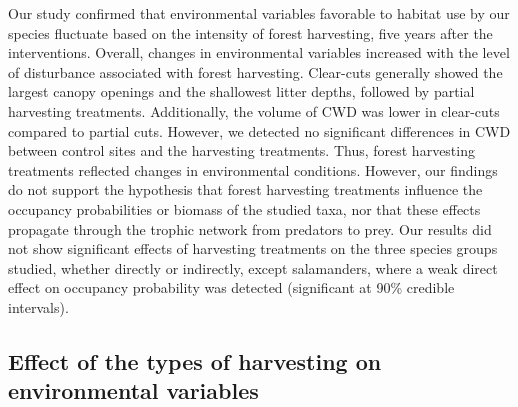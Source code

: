 Our study confirmed that environmental variables favorable to habitat use by our species fluctuate based on the intensity of forest harvesting, five years after the interventions. 
Overall, changes in environmental variables increased with the level of disturbance associated with forest harvesting. 
Clear-cuts generally showed the largest canopy openings and the shallowest litter depths, followed by partial harvesting treatments. 
Additionally, the volume of CWD was lower in clear-cuts compared to partial cuts. However, we detected no significant differences in CWD between control sites and the harvesting treatments. 
Thus, forest harvesting treatments reflected changes in environmental conditions. 
However, our findings do not support the hypothesis that forest harvesting treatments influence the occupancy probabilities or biomass of the studied taxa, nor that these effects propagate through the trophic network from predators to prey. 
Our results did not show significant effects of harvesting treatments on the three species groups studied, whether directly or indirectly, 
except salamanders, where a weak direct effect on occupancy probability was detected (significant at 90\% credible intervals). 

\subsection*{Effect of the types of harvesting on environmental variables}
\label{disc:env_var}



